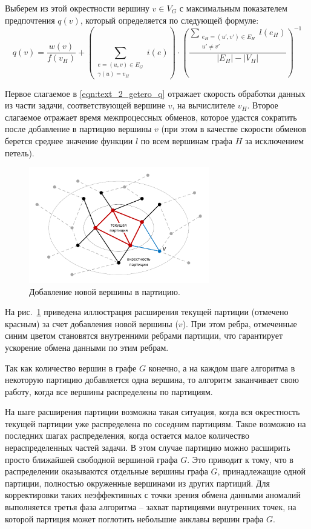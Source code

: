 Выберем из этой окрестности вершину $v \in V_G$ с максимальным показателем предпочтения $q(v)$, который определяется по следующей формуле:
\begin{equation}\label{eqn:text_2_getero_q}
	q(v) = \frac{w(v)}{f(v_H)} +
		\left( \sum_{\substack{e = (u, v) \in E_G \\ \gamma(u) = v_H}}{i(e)} \right) \cdot
		\left( \frac{\sum_{\substack{e_H = (u', v') \in E_H \\ u' \ne v'}}{l(e_H)}}{|E_H| - |V_H|} \right)^{-1}
\end{equation}

Первое слагаемое в \eqref{eqn:text_2_getero_q} отражает скорость обработки данных из части задачи, соответствующей вершине $v$, на вычислителе $v_H$.
Второе слагаемое отражает время межпроцессных обменов, которое удастся сократить после добавление в партицию вершины $v$ (при этом в качестве скорости обменов берется среднее значение функции $l$ по всем вершинам графа $H$ за исключением петель).

\begin{figure}[ht]
\centering
\includegraphics[width=0.7\textwidth]{./pics/text_2_getero/partition.pdf}
\singlespacing
{}\caption{Добавление новой вершины в партицию.}
\label{fig:text_2_getero_partition}
\end{figure}

На рис.~\ref{fig:text_2_getero_partition} приведена иллюстрация расширения текущей партиции (отмечено красным) за счет добавления новой вершины ($v$).
При этом ребра, отмеченные синим цветом становятся внутренними ребрами партиции, что гарантирует ускорение обмена данными по этим ребрам.

Так как количество вершин в графе $G$ конечно, а на каждом шаге алгоритма в некоторую партицию добавляется одна вершина, то алгоритм заканчивает свою работу, когда все вершины распределены по партициям.

На шаге расширения партиции возможна такая ситуация, когда вся окрестность текущей партиции уже распределена по соседним партициям.
Такое возможно на последних шагах распределения, когда остается малое количество нераспределенных частей задачи.
В этом случае партицию можно расширить просто ближайшей свободной вершиной графа $G$.
Это приводит к тому, что в распределении оказываются отдельные вершины графа $G$, принадлежащие одной партиции, полностью окруженные вершинами из других партиций.
Для корректировки таких неэффективных с точки зрения обмена данными аномалий выполняется третья фаза алгоритма -- захват партициями внутренних точек, на которой партиция может поглотить небольшие анклавы вершин графа $G$.

